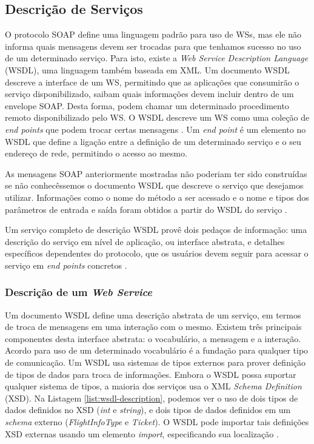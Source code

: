 \subsection{Descrição de Serviços}

O protocolo SOAP define uma linguagem padrão para uso de WSs,
mas ele não informa quais mensagens devem ser trocadas para 
que tenhamos sucesso no uso de um determinado serviço.
Para isto, existe a \textit{Web Service Description Language} (WSDL), 
uma linguagem também baseada em XML. Um documento WSDL descreve
a interface de um WS, permitindo que as aplicações
que consumirão o serviço disponibilizado, saibam quais informações
devem incluir dentro de um envelope SOAP. Desta forma, podem chamar
um determinado procedimento remoto disponibilizado pelo WS.
O WSDL descreve um WS como uma coleção de \textit{end points}
que podem trocar certas mensagens \cite{curbera2002unraveling}. Um \textit{end point} é um
elemento no WSDL que define a ligação entre a definição de um 
determinado serviço e o seu endereço de rede, permitindo o acesso
ao mesmo.

As mensagens SOAP anteriormente mostradas não poderiam ter sido
construídas se não conhecêssemos o documento WSDL que descreve
o serviço que desejamos utilizar. Informações
como o nome do método a ser acessado e o nome e tipos dos parâmetros
de entrada e saída foram obtidos a partir do WSDL do serviço \cite{curbera2002unraveling}.

Um serviço completo de descrição WSDL provê dois pedaços de informação:
uma descrição do serviço em nível de aplicação, ou interface abstrata, e 
detalhes específicos dependentes do protocolo, que os usuários
devem seguir para acessar o serviço em \textit{end points} concretos \cite{curbera2002unraveling}.

\subsubsection{Descrição de um \textit{Web Service}}

Um documento WSDL define uma descrição abstrata de um serviço, em termos
de troca de mensagens em uma interação com o mesmo. Existem três principais
componentes desta interface abstrata: o vocabulário, a mensagem e a interação. 
Acordo para uso de um determinado vocabulário é a fundação para qualquer tipo
de comunicação. Um WSDL usa sistemas de tipos externos para prover definição
de tipos de dados para troca de informações. Embora o WSDL possa suportar
qualquer sistema de tipos, a maioria dos serviços usa o XML \textit{Schema Definition} (XSD).
Na Listagem \ref{list:wsdl-description}, podemos ver o uso de dois tipos 
de dados definidos no XSD (\textit{int} e \textit{string}), e dois tipos de dados definidos
em um \textit{schema} externo (\textit{FlightInfoType} e \textit{Ticket}).
O WSDL pode importar tais definições XSD externas usando um elemento 
\textit{import}, especificando sua localização \cite{curbera2002unraveling}.

